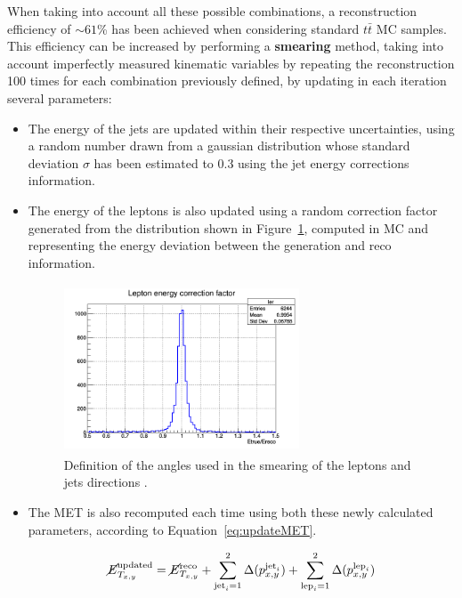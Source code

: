 \documentclass[a4paper, 10pt, openright]{report}
\begin{document}
When taking into account all these possible combinations, a reconstruction efficiency of $\sim 61$\% has been achieved when considering standard $t \bar t$ \ac{MC} samples. This efficiency can be increased by performing a \textbf{smearing} method, taking into account imperfectly measured kinematic variables by repeating the reconstruction 100 times for each combination previously defined, by updating in each iteration several parameters:
\begin{itemize}
\item The energy of the jets are updated within their respective uncertainties, using a random number drawn from a gaussian distribution whose standard deviation $\sigma$ has been estimated to 0.3 using the jet energy corrections information.

\item The energy of the leptons is also updated using a random correction factor generated from the distribution shown in Figure~\ref{fig:lepsmearing}, computed in \ac{MC} and representing the energy deviation between the generation and reco information.

\begin{figure}[htbp]
\centering
\includegraphics[width=7cm, height=5cm]{figs/ler.png}
\caption{Definition of the angles used in the smearing of the leptons and jets directions \cite{DESYAN}.}
\label{fig:lepsmearing}
\end{figure}

\item The \ac{MET} is also recomputed each time using both these newly calculated parameters, according to Equation~\ref{eq:updateMET}.

\begin{equation}
\label{eq:updateMET}
\cancel{E}_{T_{x,y}}^{\text{updated}} = \cancel{E}_{T_{x,y}}^{\text{reco}} + \sum_{\text{jet}_i = 1}^{2} \Delta(p_{x,y}^{\text{jet}_i}) + \sum_{\text{lep}_i = 1}^{2} \Delta(p_{x,y}^{\text{lep}_i})
\end{equation}


\end{itemize}
\end{document}
